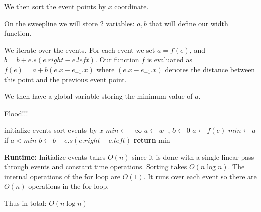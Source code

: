 \documentclass[11pt]{article}
\begin{document}
We then sort the event points by $x$ coordinate. 

On the sweepline we will store 2 variables: $a, b$ that will define our width function. 

We iterate over the events. For each event we set $a = f(e)$, and $b = b + e.s (e.right - e.left)$.
Our function $f$ is evaluated as $f(e) = a + b (e.x - e_{-1}.x)$ where 
$(e.x - e_{-1}.x)$ denotes the distance between this point and the previous event point.

We then have a global variable storing the minimum value of $a$.

\begin{algorithm}
    \caption{Flood!!!}
    \label{alg:neighbors}
    \begin{algorithmic}[1]
        \State initialize events
        \State sort events by $x$
        \State $min \gets +\infty$
        \State $a \gets w^-$, $b \gets 0$
            \State $a \gets f(e)$
            \State $min \gets a$ if $a < min$
            \State $b \gets b + e.s (e.right - e.left)$
        \EndFor
        \State \textbf{return} min
    \EndFunction
    \end{algorithmic}
\end{algorithm}

\textbf{Runtime:} Initialize events takes $O(n)$ since it is done with a single linear pass through events and constant time operations.
Sorting takes $O(n \log n)$. The internal operations of the for loop are $O(1)$. 
It runs over each event so there are $O(n)$ operations in the for loop.

Thus in total: $O(n \log n)$
\end{document}
